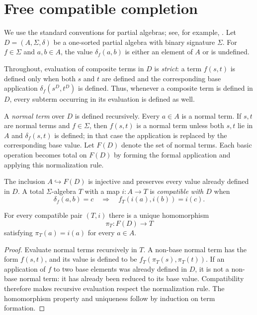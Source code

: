 \section{Free compatible completion}\label{sec:free-completion}

We use the standard conventions for partial algebras; see, for example,
\cite{Burmeister1986}.  Let $D=(A,\Sigma,\delta)$ be a one-sorted partial
algebra with binary signature $\Sigma$.  For $f\in\Sigma$ and $a,b\in A$, the
value $\delta_f(a,b)$ is either an element of $A$ or is undefined.

Throughout, evaluation of composite terms in $D$ is \emph{strict}: a term
$f(s,t)$ is defined only when both $s$ and $t$ are defined and the corresponding
base application $\delta_f(s^D,t^D)$ is defined.  Thus, whenever a composite
term is defined in $D$, every subterm occurring in its evaluation is defined as
well.

A \emph{normal term} over $D$ is defined recursively.  Every $a\in A$ is a
normal term.  If $s,t$ are normal terms and $f\in\Sigma$, then $f(s,t)$ is a
normal term unless both $s,t$ lie in $A$ and $\delta_f(s,t)$ is defined; in
that case the application is replaced by the corresponding base value.  Let
$F(D)$ denote the set of normal terms.  Each basic operation becomes total on
$F(D)$ by forming the formal application and applying this normalization rule.

The inclusion $A\hookrightarrow F(D)$ is injective and preserves every value
already defined in $D$.  A total $\Sigma$-algebra $T$ with a map $i:A\to T$ is
\emph{compatible with $D$} when
\[
 \delta_f(a,b)=c
 \quad\Longrightarrow\quad
 f_T(i(a),i(b))=i(c).
\]

\begin{theorem}\label{thm:free-completion}
For every compatible pair $(T,i)$ there is a unique homomorphism
\[
 \pi_T:F(D)\longrightarrow T
\]
satisfying $\pi_T(a)=i(a)$ for every $a\in A$.
\end{theorem}

\begin{proof}
Evaluate normal terms recursively in $T$.  A non-base normal term has the form
$f(s,t)$, and its value is defined to be
$f_T(\pi_T(s),\pi_T(t))$.  If an application of $f$ to two base elements was
already defined in $D$, it is not a non-base normal term: it has already been
reduced to its base value.  Compatibility therefore makes recursive evaluation
respect the normalization rule.  The homomorphism property and uniqueness
follow by induction on term formation.
\end{proof}
